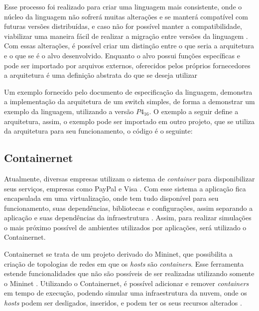 Esse processo foi realizado para criar uma linguagem mais consistente, onde o núcleo da 
linguagem não sofrerá muitas alterações e se manterá compatível com futuras versões 
distribuídas, e caso não for possível manter a compatibilidade, viabilizar uma maneira 
fácil de realizar a migração entre versões da linguagem \citep{paxos16spec}. Com essas
alterações, é possível criar um distinção entre o que seria a arquitetura e o que se
é o alvo desenvolvido. Enquanto o alvo possui funções específicas e pode ser importado
por arquivos externos, oferecidos pelos próprios fornecedores a arquitetura é uma definição
abstrata do que se deseja utilizar

Um exemplo fornecido pelo documento de especificação da linguagem, demonstra a implementação
da arquitetura de um switch simples, de forma a demonstrar um exemplo  da linguagem,
utilizando a versão $P4_{16}$\citep{paxos16spec}. O exemplo a seguir define a arquitetura,
assim, o exemplo pode ser importado em outro projeto, que se utiliza da arquitetura para
seu funcionamento, o código é o seguinte:



\subsection{Containernet}
Atualmente, diversas empresas utilizam o sistema de \textit{container} para disponibilizar seus 
serviços, empresas como PayPal e Visa \citep{dockerSite}. Com esse sistema a aplicação 
fica encapsulada em uma virtualização, onde tem tudo disponível para seu funcionamento, suas 
dependências, bibliotecas e configurações, assim separando a aplicação e suas dependências 
da infraestrutura \citep{dockerSite}. Assim, para realizar simulações o mais próximo possível
de ambientes utilizados por aplicações, será utilizado o Containernet.

Containernet se trata de um projeto derivado do Mininet, que possibilita a criação de
topologias de redes em que os \textit{hosts} são \textit{containers}. Esse ferramenta estende 
funcionalidades que não são possíveis de ser realizadas utilizando somente o Mininet
\citep{mininetDocs}. Utilizando o Containernet, é possível adicionar e remover 
\textit{containers} em tempo de execução, podendo simular uma infraestrutura da nuvem, onde os 
\textit{hosts} podem ser desligados, inseridos, e podem ter os seus recursos alterados
\citep{peuster2016medicine}.

